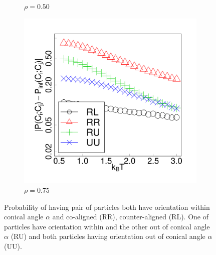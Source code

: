 \begin{figure}[h]
\begin{subfigure}[t]{0.32\textwidth}
	\caption{$\rho = 0.50$}
\end{subfigure}
\begin{subfigure}[t]{0.32\textwidth}
	\centering
	\includegraphics[width=\textwidth]{Images/probs_75}
	\caption{$\rho = 0.75$}
\end{subfigure}
	\captionsetup{justification=centering, width=0.9\columnwidth}
	\caption{Probability of having pair of particles both have orientation within conical angle $\alpha$ and co-aligned (RR), counter-aligned (RL). One of particles have orientation within and the other out of conical angle $\alpha$ (RU) and both particles having orientation out of conical angle $\alpha$ (UU).}
	\label{fig:chain_prob_dist_01}
\end{figure}